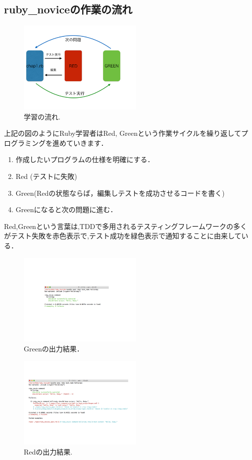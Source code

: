 \subsection{ruby\_noviceの作業の流れ}
\begin{figure}[htbp]\begin{center}
\includegraphics[width=6cm,bb=0 0 442 500]{../figs/./ruby_novice.003.jpg}
\caption{学習の流れ.}
\label{default}\end{center}\end{figure}
上記の図のようにRuby学習者はRed, Greenという作業サイクルを繰り返してプログラミングを進めていきます．

\begin{enumerate}
\item 作成したいプログラムの仕様を明確にする．
\item Red (テストに失敗)
\item Green(Redの状態ならば，編集しテストを成功させるコードを書く)
\item Greenになると次の問題に進む．
\end{enumerate}
Red,Greenという言葉は,TDDで多用されるテスティングフレームワークの多くがテスト失敗を赤色表示で,テスト成功を緑色表示で通知することに由来している．

\begin{figure}[htbp]\begin{center}
\includegraphics[width=6cm,bb=0 0 442 500]{../figs/./ruby_novice.004.jpg}
\caption{Greenの出力結果．}
\label{default}\end{center}\end{figure}
\begin{figure}[htbp]\begin{center}
\includegraphics[width=6cm,bb=0 0 442 500]{../figs/./ruby_novice.005.jpg}
\caption{Redの出力結果.}
\label{default}\end{center}\end{figure}
